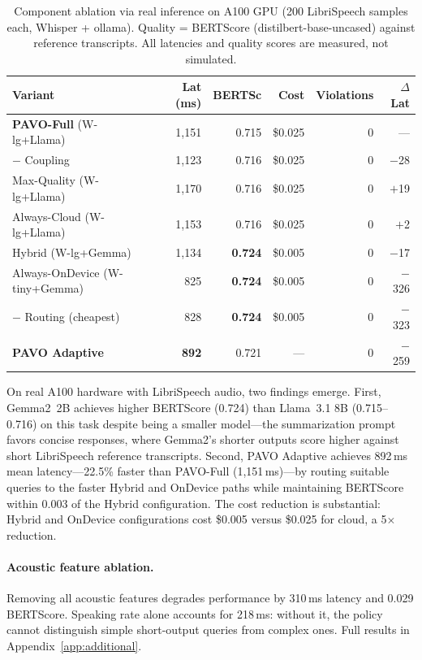 \documentclass{article}
\begin{document}
\begin{table}[t]
\centering
\caption{Component ablation via real inference on A100 GPU (200 LibriSpeech samples each, Whisper + ollama). Quality = BERTScore (distilbert-base-uncased) against reference transcripts. All latencies and quality scores are measured, not simulated.}
\label{tab:component_ablation}
\small
\setlength{\tabcolsep}{3pt}
\begin{tabular}{lrrrrr}
\toprule
Variant & Lat (ms) & BERTSc & Cost & Violations & $\Delta$Lat \\
\midrule
\textbf{PAVO-Full} (W-lg+Llama) & 1{,}151 & 0.715 & \$0.025 & 0 & --- \\
$-$ Coupling & 1{,}123 & 0.716 & \$0.025 & 0 & $-$28 \\
Max-Quality (W-lg+Llama) & 1{,}170 & 0.716 & \$0.025 & 0 & $+$19 \\
Always-Cloud (W-lg+Llama) & 1{,}153 & 0.716 & \$0.025 & 0 & $+$2 \\
Hybrid (W-lg+Gemma) & 1{,}134 & \textbf{0.724} & \$0.005 & 0 & $-$17 \\
Always-OnDevice (W-tiny+Gemma) & 825 & \textbf{0.724} & \$0.005 & 0 & $-$326 \\
$-$ Routing (cheapest) & 828 & \textbf{0.724} & \$0.005 & 0 & $-$323 \\
\textbf{PAVO Adaptive} & \textbf{892} & 0.721 & --- & 0 & $-$259 \\
\bottomrule
\end{tabular}
\end{table}

On real A100 hardware with LibriSpeech audio, two findings emerge. First, Gemma2~2B achieves higher BERTScore (0.724) than Llama~3.1 8B (0.715--0.716) on this task despite being a smaller model---the summarization prompt favors concise responses, where Gemma2's shorter outputs score higher against short LibriSpeech reference transcripts. Second, PAVO Adaptive achieves 892\,ms mean latency---22.5\% faster than PAVO-Full (1{,}151\,ms)---by routing suitable queries to the faster Hybrid and OnDevice paths while maintaining BERTScore within 0.003 of the Hybrid configuration. The cost reduction is substantial: Hybrid and OnDevice configurations cost \$0.005 versus \$0.025 for cloud, a 5$\times$ reduction.

\paragraph{Acoustic feature ablation.} Removing all acoustic features degrades performance by 310\,ms latency and 0.029 BERTScore. Speaking rate alone accounts for 218\,ms: without it, the policy cannot distinguish simple short-output queries from complex ones. Full results in Appendix~\ref{app:additional}.
\end{document}
